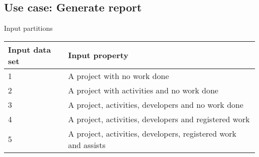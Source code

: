 \subsection{Use case: Generate report}


Input partitions
\begin{center}
  \begin{tabular}{| l | l |}
    \hline
	Input data set & Input property \\ \hline
    1 & A project with no work done \\ \hline
    2 & A project with activities and no work done \\ \hline
    3 & A project, activities, developers and no work done \\ \hline
	4 & A project, activities, developers and registered work \\ \hline
	5 & A project, activities, developers, registered work and assists \\
    \hline
  \end{tabular}
\end{center}



